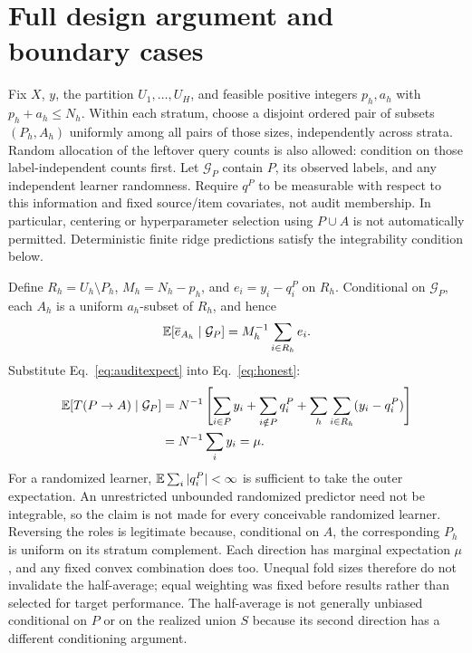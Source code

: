 \section{Full design argument and boundary cases}\label{app:proof}
Fix $X$, $y$, the partition $U_1,\ldots,U_H$, and feasible positive integers $p_h,a_h$ with $p_h+a_h\leq N_h$. Within each stratum, choose a disjoint ordered pair of subsets $(P_h,A_h)$ uniformly among all pairs of those sizes, independently across strata. Random allocation of the leftover query counts is also allowed: condition on those label-independent counts first. Let $\mathcal G_P$ contain $P$, its observed labels, and any independent learner randomness. Require $q^P$ to be measurable with respect to this information and fixed source/item covariates, not audit membership. In particular, centering or hyperparameter selection using $P\cup A$ is not automatically permitted. Deterministic finite ridge predictions satisfy the integrability condition below.

Define $R_h=U_h\setminus P_h$, $M_h=N_h-p_h$, and $e_i=y_i-q_i^P$ on $R_h$. Conditional on $\mathcal G_P$, each $A_h$ is a uniform $a_h$-subset of $R_h$, and hence
\begin{equation}\label{eq:auditexpect}
\mathbb E\!\left[\overline e_{A_h}\mid\mathcal G_P\right]
=M_h^{-1}\sum_{i\in R_h}e_i.
\end{equation}
Substitute Eq.~\eqref{eq:auditexpect} into Eq.~\eqref{eq:honest}:
\begin{align}
\mathbb E[T(P\to A)\mid\mathcal G_P]
&=N^{-1}\left[\sum_{i\in P}y_i+\sum_{i\notin P}q_i^P+
\sum_h\sum_{i\in R_h}(y_i-q_i^P)\right]\\
&=N^{-1}\sum_i y_i=\mu.\label{eq:proof}
\end{align}
For a randomized learner, $\mathbb E\sum_i|q_i^P|<\infty$ is sufficient to take the outer expectation. An unrestricted unbounded randomized predictor need not be integrable, so the claim is not made for every conceivable randomized learner. Reversing the roles is legitimate because, conditional on $A$, the corresponding $P_h$ is uniform on its stratum complement. Each direction has marginal expectation $\mu$, and any fixed convex combination does too. Unequal fold sizes therefore do not invalidate the half-average; equal weighting was fixed before results rather than selected for target performance. The half-average is not generally unbiased conditional on $P$ or on the realized union $S$ because its second direction has a different conditioning argument.

